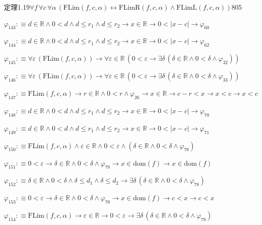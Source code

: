 \begin{fullproof}{定理1.19}{$\forall f\,\forall c\,\forall \alpha\,(\mathrm{FLim}(f,c,\alpha) \leftrightarrow \mathrm{FLimR}(f,c,\alpha) \land \mathrm{FLimL}(f,c,\alpha))$}{805}
\begin{abbrevlist}
\item $\varphi_{143} :\equiv d \in \mathbb{R} \land 0 < d \land d \leq r_{1} \land d \leq r_{2} \to x \in \mathbb{R} \to 0 < \lvert x - c \rvert \to \varphi_{60}$
\item $\varphi_{144} :\equiv d \in \mathbb{R} \land 0 < d \land d \leq r_{1} \land d \leq r_{2} \to x \in \mathbb{R} \to 0 < \lvert x - c \rvert \to \varphi_{62}$
\item $\varphi_{145} :\equiv \forall \varepsilon\,(\mathrm{FLim}(f,c,\alpha)) \to \forall \varepsilon \in \mathbb{R}\,(0 < \varepsilon \to \exists \delta\,(\delta \in \mathbb{R} \land 0 < \delta \land \varphi_{32}))$
\item $\varphi_{146} :\equiv \forall \varepsilon\,(\mathrm{FLim}(f,c,\alpha)) \to \forall \varepsilon \in \mathbb{R}\,(0 < \varepsilon \to \exists \delta\,(\delta \in \mathbb{R} \land 0 < \delta \land \varphi_{33}))$
\item $\varphi_{147} :\equiv \mathrm{FLim}(f,c,\alpha) \to r \in \mathbb{R} \land 0 < r \land \varphi_{26} \to x \in \mathbb{R} \to c - r < x \to x < c \to x < c$
\item $\varphi_{148} :\equiv d \in \mathbb{R} \land 0 < d \land d \leq r_{1} \land d \leq r_{2} \to x \in \mathbb{R} \to 0 < \lvert x - c \rvert \to \varphi_{70}$
\item $\varphi_{149} :\equiv d \in \mathbb{R} \land 0 < d \land d \leq r_{1} \land d \leq r_{2} \to x \in \mathbb{R} \to 0 < \lvert x - c \rvert \to \varphi_{71}$
\item $\varphi_{150} :\equiv \mathrm{FLim}(f,c,\alpha) \land \varepsilon \in \mathbb{R} \land 0 < \varepsilon \land (\delta \in \mathbb{R} \land 0 < \delta \land \varphi_{78})$
\item $\varphi_{151} :\equiv 0 < \varepsilon \to \delta \in \mathbb{R} \land 0 < \delta \land \varphi_{78} \to x \in \mathrm{dom}(f) \to x \in \mathrm{dom}(f)$
\item $\varphi_{152} :\equiv \delta \in \mathbb{R} \land 0 < \delta \land \delta \leq d_{1} \land \delta \leq d_{2} \to \exists \delta\,(\delta \in \mathbb{R} \land 0 < \delta \land \varphi_{78})$
\item $\varphi_{153} :\equiv 0 < \varepsilon \to \delta \in \mathbb{R} \land 0 < \delta \land \varphi_{78} \to x \in \mathrm{dom}(f) \to c < x \to c < x$
\item $\varphi_{154} :\equiv \mathrm{FLim}(f,c,\alpha) \to \varepsilon \in \mathbb{R} \to 0 < \varepsilon \to \exists \delta\,(\delta \in \mathbb{R} \land 0 < \delta \land \varphi_{78})$

\end{abbrevlist}
\end{fullproof}

